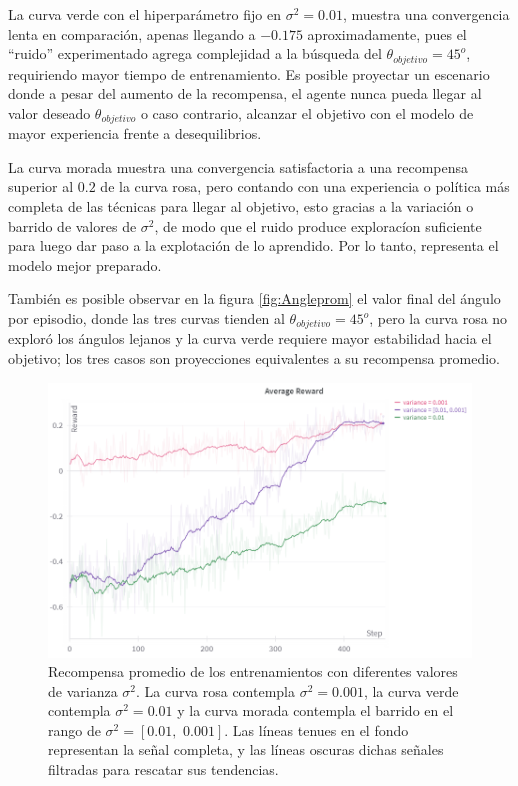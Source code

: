 La curva verde con el hiperparámetro fijo en $\sigma^2=0.01$, muestra una convergencia lenta en comparación, apenas llegando a $-0.175$ aproximadamente, pues el ``ruido'' experimentado agrega complejidad a la búsqueda del $\theta_{objetivo}=45^o$, requiriendo mayor tiempo de entrenamiento. Es posible proyectar un escenario donde a pesar del aumento de la recompensa, el agente nunca pueda llegar al valor deseado $\theta_{objetivo}$ o caso contrario, alcanzar el objetivo con el modelo de mayor experiencia frente a desequilibrios.

La curva morada muestra una convergencia satisfactoria a una recompensa superior al $0.2$ de la curva rosa, pero contando con una experiencia o política más completa de las técnicas para llegar al objetivo, esto gracias a la variación o barrido de valores de $\sigma^2$, de modo que el ruido produce exploracíon suficiente para luego dar paso a la explotación de lo aprendido. Por lo tanto, representa el modelo mejor preparado.

También es posible observar en la figura \ref{fig:Angleprom} el valor final del ángulo por episodio, donde las tres curvas tienden al $\theta_{objetivo}=45^o$, pero la curva rosa no exploró los ángulos lejanos y la curva verde requiere mayor estabilidad hacia el objetivo; los tres casos son proyecciones equivalentes a su recompensa promedio.


\begin{figure}[hh]
	\centering
	\includegraphics[scale=0.5]{fig/new/PPOentrenados.png}
	\caption{Recompensa promedio de los entrenamientos con diferentes valores de varianza $\sigma^2$. La curva rosa contempla $\sigma^2=0.001$, la curva verde contempla $\sigma^2=0.01$ y la curva morada contempla el barrido en el rango de $\sigma^2=[0.01, \,\, 0.001]$. Las líneas tenues en el fondo representan la señal completa, y las líneas oscuras dichas señales filtradas para rescatar sus tendencias.}
	\label{fig:Rewsprom}
\end{figure}

